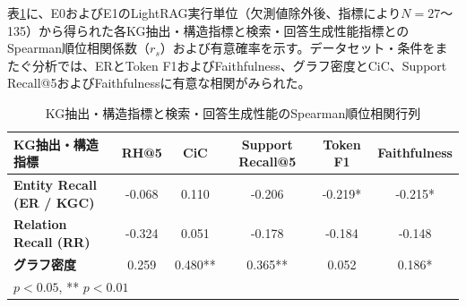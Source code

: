 \documentclass[a4j,dvipdfmx]{jsarticle}
\begin{document}
\begin{table}[t]
\centering
\caption{抽出精度・検索対象ノード発見率・推論経路妥当性・回答生成品質の総合比較（E0）}
\label{tab:performance_summary}
\small
{}
\end{table}

表\ref{tab:spearman_corr}に、E0およびE1のLightRAG実行単位（欠測値除外後、指標により$N=27$〜135）から得られた各KG抽出・構造指標と検索・回答生成性能指標とのSpearman順位相関係数（$r_s$）および有意確率を示す。データセット・条件をまたぐ分析では、ERとToken F1およびFaithfulness、グラフ密度とCiC、Support Recall@5およびFaithfulnessに有意な相関がみられた。

\begin{table}[t]
\centering
\caption{KG抽出・構造指標と検索・回答生成性能のSpearman順位相関行列}
\label{tab:spearman_corr}
\small
\begin{tabular}{l|ccccc}
\hline
\textbf{KG抽出・構造指標} & \textbf{RH@5} & \textbf{CiC} & \textbf{Support Recall@5} & \textbf{Token F1} & \textbf{Faithfulness} \\
\hline
\textbf{Entity Recall (ER / KGC)} & -0.068 & 0.110 & -0.206 & -0.219* & -0.215* \\
\textbf{Relation Recall (RR)} & -0.324 & 0.051 & -0.178 & -0.184 & -0.148 \\
\textbf{グラフ密度} & 0.259 & 0.480** & 0.365** & 0.052 & 0.186* \\
\hline
\multicolumn{6}{l}{\footnotesize * $p < 0.05$, ** $p < 0.01$}
\end{tabular}
\end{table}
\end{document}
